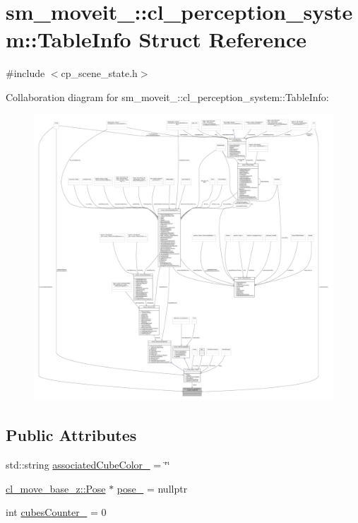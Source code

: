 \hypertarget{structsm__moveit__4_1_1cl__perception__system_1_1TableInfo}{}\section{sm\+\_\+moveit\+\_\+:\+:cl\+\_\+perception\+\_\+system\+:\+:Table\+Info Struct Reference}
\label{structsm__moveit__4_1_1cl__perception__system_1_1TableInfo}


{\ttfamily \#include $<$cp\+\_\+scene\+\_\+state.\+h$>$}



Collaboration diagram for sm\+\_\+moveit\+\_\+:\+:cl\+\_\+perception\+\_\+system\+:\+:Table\+Info\+:
\nopagebreak
\begin{figure}[H]
\begin{center}
\leavevmode
\includegraphics[width=350pt]{structsm__moveit__4_1_1cl__perception__system_1_1TableInfo__coll__graph}
\end{center}
\end{figure}
\subsection*{Public Attributes}
\begin{DoxyCompactItemize}
\item 
std\+::string \hyperlink{structsm__moveit__4_1_1cl__perception__system_1_1TableInfo_ab608d639c8f059030570cadad37b4dab}{associated\+Cube\+Color\+\_\+} = \char`\"{}\char`\"{}
\item 
\hyperlink{classcl__move__base__z_1_1Pose}{cl\+\_\+move\+\_\+base\+\_\+z\+::\+Pose} $\ast$ \hyperlink{structsm__moveit__4_1_1cl__perception__system_1_1TableInfo_a937c9bb7e6d237080c816d7e369d0caf}{pose\+\_\+} = nullptr
\item 
int \hyperlink{structsm__moveit__4_1_1cl__perception__system_1_1TableInfo_abf1c1a2458e454e8bb4691f3d2f05fa5}{cubes\+Counter\+\_\+} = 0
\end{DoxyCompactItemize}



